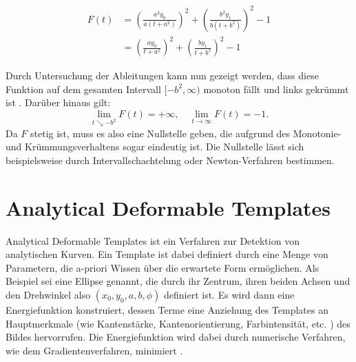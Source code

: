\begin{enumerate}
\[
	\begin{aligned}
		F(t) &= \left(\frac{a^2y_0}{a\left(t+a^2\right)}\right)^2 + \left(\frac{b^2y_1}{b\left(t+b^2\right)}\right)^2 - 1 \\
		&= \left(\frac{ay_0}{t+a^2}\right)^2 + \left(\frac{by_1}{t+b^2}\right)^2 - 1
	\end{aligned}
\]

	Durch Untersuchung der Ableitungen kann nun gezeigt werden, dass diese Funktion auf dem gesamten Intervall $[-b^2,\infty)$ monoton fällt und links gekrümmt ist \cite{Eberly2013}. Darüber hinaus gilt:
	\[
	\lim\limits_{t \searrow -b^2}{F(t)}	= +\infty, \quad\lim\limits_{t \rightarrow \infty}{F(t)}	= -1.
	\]
	Da $F$ stetig ist, muss es also eine Nullstelle geben, die aufgrund des Monotonie- und Krümmungsverhaltens sogar eindeutig ist. Die Nullstelle lässt sich beispielsweise durch Intervallschachtelung oder Newton-Verfahren bestimmen.
\end{enumerate}


\section{Analytical Deformable Templates}
\label{s:anaDef}
Analytical Deformable Templates ist ein Verfahren zur Detektion von analytischen Kurven.
Ein Template ist dabei definiert durch eine Menge von Parametern, die a-priori Wissen über die erwartete Form ermöglichen.
Als Beispiel sei eine  Ellipse genannt, die durch ihr Zentrum, ihren beiden Achsen und den Drehwinkel also $(x_0,y_0,a,b,\phi)$ definiert ist.
Es wird dann eine Energiefunktion konstruiert, dessen Terme eine Anziehung des Templates an Hauptmerkmale (wie Kantenstärke, Kantenorientierung, Farbintensität, etc. ) des Bildes hervorrufen.
Die Energiefunktion wird dabei durch numerische Verfahren, wie dem Gradientenverfahren, minimiert \cite{Yuille1992}.
